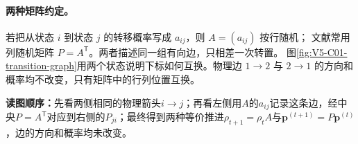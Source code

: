 \documentclass[UTF8,a4paper,11pt,openany]{ctexbook}
\begin{document}
\setcounter{page}{578}
\setcounter{chapter}{30}
\setcounter{figure}{1}
\pagestyle{headings}
\paragraph{两种矩阵约定。}若把从状态 $i$ 到状态 $j$ 的转移概率写成 $a_{ij}$，则 $A=(a_{ij})$ 按行随机；\PageRank{} 文献常用列随机矩阵 $P=A^{\mathsf T}$。两者描述同一组有向边，只相差一次转置。
图\ref{fig:V5-C01-transition-graph}用两个状态说明下标如何互换。物理边 $1\to2$ 与 $2\to1$ 的方向和概率均不改变，只有矩阵中的行列位置互换。


\noindent\textbf{读图顺序：}先看两侧相同的物理箭头$i\to j$；再看左侧用$A$的$a_{ij}$记录这条边，经中央$P=A^{\mathsf T}$对应到右侧的$P_{ji}$；最终得到两种等价推进$\rho_{t+1}=\rho_tA$与$\boldsymbol p^{(t+1)}=P\boldsymbol p^{(t)}$，边的方向和概率均未改变。
\end{document}
